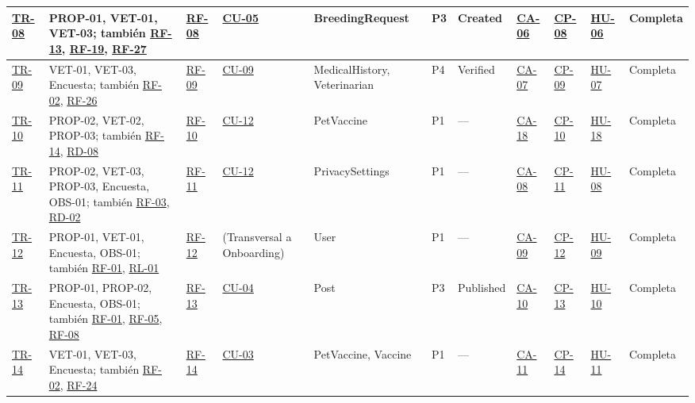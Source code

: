 \documentclass[journal,onecolumn]{IEEEtran}
\begin{document}
\begin{landscape}
\begin{longtable}{@{}p{0.8cm} p{4.0cm} p{1.3cm} p{1.7cm} p{2.5cm} p{1.0cm} p{1.9cm} p{0.9cm} p{0.9cm} p{1.75cm} p{2.2cm}@{}}
			\hyperref[tr:08]{TR-08}\label{tr:08} & PROP-01, VET-01, VET-03; también \hyperref[tab:RF-13]{RF-13}, \hyperref[tab:RF-19]{RF-19}, \hyperref[tab:RF-27]{RF-27} & \hyperref[tab:RF-08]{RF-08} & \hyperref[tab:CU-05]{CU-05} & BreedingRequest & P3 & Created & \hyperref[lst:ca06]{CA-06} & \hyperref[cp:08]{CP-08} & \hyperref[tab:HU-06]{HU-06} & Completa \\ \midrule
			\hyperref[tr:09]{TR-09}\label{tr:09} & VET-01, VET-03, Encuesta; también \hyperref[tab:RF-02]{RF-02}, \hyperref[tab:RF-26]{RF-26} & \hyperref[tab:RF-09]{RF-09} & \hyperref[tab:CU-09]{CU-09} & MedicalHistory, Veterinarian & P4 & Verified & \hyperref[lst:ca07]{CA-07} & \hyperref[cp:09]{CP-09} & \hyperref[tab:HU-07]{HU-07} & Completa \\ \midrule
			\hyperref[tr:10]{TR-10}\label{tr:10} & PROP-02, VET-02, PROP-03; también \hyperref[tab:RF-14]{RF-14}, \hyperref[tab:RD-08]{RD-08} & \hyperref[tab:RF-10]{RF-10} & \hyperref[tab:CU-12]{CU-12} & PetVaccine & P1 & --- & \hyperref[lst:ca18]{CA-18} & \hyperref[cp:10]{CP-10} & \hyperref[tab:HU-18]{HU-18} & Completa \\ \midrule
			\hyperref[tr:11]{TR-11}\label{tr:11} & PROP-02, VET-03, PROP-03, Encuesta, OBS-01; también \hyperref[tab:RF-03]{RF-03}, \hyperref[tab:RD-02]{RD-02} & \hyperref[tab:RF-11]{RF-11} & \hyperref[tab:CU-12]{CU-12} & PrivacySettings & P1 & --- & \hyperref[lst:ca08]{CA-08} & \hyperref[cp:11]{CP-11} & \hyperref[tab:HU-08]{HU-08} & Completa \\ \midrule
			\hyperref[tr:12]{TR-12}\label{tr:12} & PROP-01, VET-01, Encuesta, OBS-01; también \hyperref[tab:RF-01]{RF-01}, \hyperref[rl:01]{RL-01} & \hyperref[tab:RF-12]{RF-12} & (Transversal a Onboarding) & User & P1 & --- & \hyperref[lst:ca09]{CA-09} & \hyperref[cp:12]{CP-12} & \hyperref[tab:HU-09]{HU-09} & Completa \\ \midrule
			\hyperref[tr:13]{TR-13}\label{tr:13} & PROP-01, PROP-02, Encuesta, OBS-01; también \hyperref[tab:RF-01]{RF-01}, \hyperref[tab:RF-05]{RF-05}, \hyperref[tab:RF-08]{RF-08} & \hyperref[tab:RF-13]{RF-13} & \hyperref[tab:CU-04]{CU-04} & Post & P3 & Published & \hyperref[lst:ca10]{CA-10} & \hyperref[cp:13]{CP-13} & \hyperref[tab:HU-10]{HU-10} & Completa \\ \midrule
			\hyperref[tr:14]{TR-14}\label{tr:14} & VET-01, VET-03, Encuesta; también \hyperref[tab:RF-02]{RF-02}, \hyperref[tab:RF-24]{RF-24} & \hyperref[tab:RF-14]{RF-14} & \hyperref[tab:CU-03]{CU-03} & PetVaccine, Vaccine & P1 & --- & \hyperref[lst:ca11]{CA-11} & \hyperref[cp:14]{CP-14} & \hyperref[tab:HU-11]{HU-11} & Completa \\ \midrule

\end{longtable}
\end{landscape}
\end{document}
